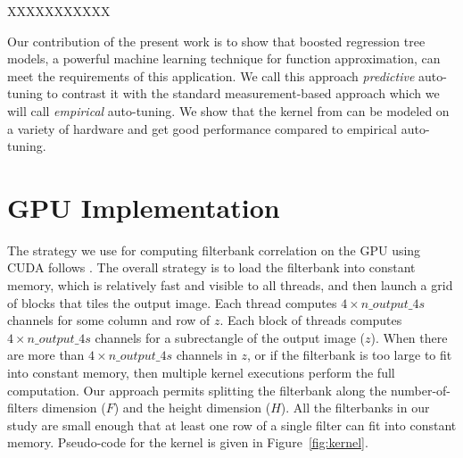 \documentclass{sig-alternate}
\begin{document}
XXXXXXXXXXX

Our contribution of the present work is to show that boosted regression tree models,
a powerful machine learning technique for function approximation, can meet the
requirements of this application.
We call this approach {\em predictive} auto-tuning to contrast it with the standard measurement-based approach which we will call {\em empirical} auto-tuning.
We show that the kernel from \citet{pinto+cox:2011gcg} can be modeled on a variety of hardware and get good performance compared to empirical auto-tuning.



\section{GPU Implementation}
\label{sec:kernel}

The strategy we use for computing filterbank correlation on the GPU
using CUDA follows \citet{pinto+cox:2011gcg}.
The overall strategy is to load the filterbank into constant memory, which is
relatively fast and visible to all threads, and then launch a grid of blocks
that tiles the output image.
Each thread computes $4 \times n\_output\_4s$ channels for some column and row of $z$.
Each block of threads computes $4 \times n\_output\_4s$ channels for a subrectangle of the output image ($z$).
When there are more than $4 \times n\_output\_4s$ channels in $z$, or if the
filterbank is too large to fit into constant memory, then multiple
kernel executions perform the full computation.
Our approach permits splitting the filterbank along
the number-of-filters dimension ($F$) and the height dimension ($H$).
All the filterbanks in our study are small enough that
at least one row of a single filter can fit into constant memory.
Pseudo-code for the kernel is given in Figure~\ref{fig:kernel}.
\end{document}
